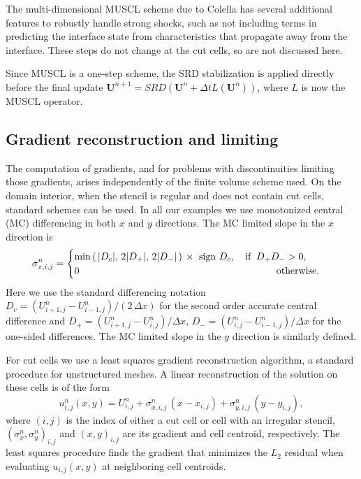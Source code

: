 The multi-dimensional MUSCL scheme due to Colella has several additional
features to robustly handle strong shocks, such as not including terms in
predicting the interface state from characteristics that propagate 
away from the interface. These
steps do not change at the cut cells, so are not discussed here.  

Since MUSCL is a one-step scheme, the SRD stabilization is applied directly
before the final update
$\mathbf{U}^{n+1} = SRD(\mathbf{U}^{n} + \Delta t
L(\mathbf{U}^{n}))$, where $L$ is now the MUSCL operator.



\subsection{Gradient reconstruction and limiting }\label{sec:limit}

The computation of gradients, and for problems with discontinuities limiting
those gradients, arises independently of the finite volume scheme used. 
On the domain interior, when the stencil is regular and does not contain cut cells, standard schemes can be used.
In all our examples we use monotonized central (MC) differencing in both $x$ and $y$ directions.  The MC limited slope in the $x$ direction is
\begin{equation}
\sigma^n_{x,i,j} =  \begin{cases} 
\min \left ( \,  \lvert{ D_c}\rvert,\,
2 \lvert {D_+}\rvert,\,
2 \lvert{D_-}\rvert \,  \right ) \,\times 
\text{ sign } D_c, \quad \text{if} \;\;  D_+ D_- >  0,\\
0 \hspace*{2.8in} \text{otherwise}.
\end{cases}
\end{equation}
Here we use the standard differencing notation
$D_c = (U^n_{i+1,j}-U^n_{i-1,j})/(2 \, \Delta x)$ for the second order accurate central difference and
$D_+ = (U^n_{i+1,j}-U^n_{i,j})/\Delta x$,
$D_- = (U^n_{i,j}-U^n_{i-1,j})/\Delta x$ for the one-sided differences.  The MC limited slope in the $y$ direction is similarly defined.

For cut cells 
we use a least squares gradient reconstruction algorithm, a standard procedure
for unstructured meshes.
A linear reconstruction of the solution on these cells is of the form
\begin{equation}
u^n_{i,j}(x,y) = U_{i,j}^n + \sigma^n_{x,i,j} \,(x-x_{i,j}) +
                     \sigma^n_{y,i,j}\,(y-y_{i,j}),
\label{eqn:lls}
\end{equation}
where $(i,j)$ is the index of either a cut cell or cell with an irregular stencil, $(\sigma^n_{x},\sigma^n_{y})_{i,j}$ and $(x,y)_{i,j}$ are its gradient and cell centroid, respectively. The least squares procedure finds the gradient that minimizes the $L_2$ residual when evaluating  $u_{i,j}(x,y)$ at  
neighboring cell centroids. 

